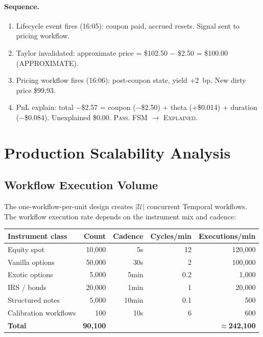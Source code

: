 \documentclass[11pt,a4paper]{article}
\begin{document}
\paragraph{Sequence.}
\begin{enumerate}[nosep]
\item Lifecycle event fires (16:05): coupon paid, accrued resets.  Signal sent to pricing workflow.
\item Taylor invalidated: approximate price = \$102.50 $-$ \$2.50 = \$100.00 (APPROXIMATE).
\item Pricing workflow fires (16:06): post-coupon state, yield +2~bp.  New dirty price \$99.93.
\item PnL explain: total $-$\$2.57 = coupon ($-$\$2.50) + theta (+\$0.014) + duration ($-$\$0.084).  Unexplained \$0.00.  \textsc{Pass}.  FSM $\to$ \textsc{Explained}.
\end{enumerate}

\clearpage
\section{Production Scalability Analysis}
\label{sec:scalability}

\subsection{Workflow Execution Volume}

The one-workflow-per-unit design creates $|\mathcal{U}|$ concurrent Temporal workflows.  The workflow execution rate depends on the instrument mix and cadence:

\begin{center}
\small
\begin{tabular}{l r r r r}
\toprule
\textbf{Instrument class} & \textbf{Count} & \textbf{Cadence} & \textbf{Cycles/min} & \textbf{Executions/min} \\
\midrule
Equity spot & 10{,}000 & 5s & 12 & 120{,}000 \\
Vanilla options & 50{,}000 & 30s & 2 & 100{,}000 \\
Exotic options & 5{,}000 & 5min & 0.2 & 1{,}000 \\
IRS / bonds & 20{,}000 & 1min & 1 & 20{,}000 \\
Structured notes & 5{,}000 & 10min & 0.1 & 500 \\
Calibration workflows & 100 & 10s & 6 & 600 \\
\midrule
\textbf{Total} & \textbf{90{,}100} & & & $\approx$\textbf{242{,}100} \\
\bottomrule
\end{tabular}
\end{center}
\end{document}
